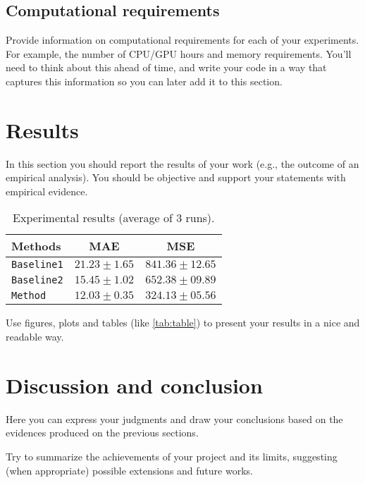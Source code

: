 \documentclass{gdl}
\begin{document}
\subsection{Computational requirements}
Provide information on computational requirements for each of your experiments. For example, the number of CPU/GPU hours and memory requirements. You'll need to think about this ahead of time, and write your code in a way that captures this information so you can later add it to this section. 

\section{Results}

In this section you should report the results of your work (e.g., the outcome of an empirical analysis). You should be objective and support your statements with empirical evidence.

\begin{table}[h]
\small\sf\centering
\caption{Experimental results (average of 3 runs).}
\begin{tabular}{l c c}
\toprule
Methods & MAE & MSE\\
\midrule
\texttt{Baseline1} & $21.23 \pm 1.65$ & $841.36 \pm 12.65$\\
\texttt{Baseline2} & $15.45 \pm 1.02$ & $652.38 \pm 09.89$\\
\midrule
\texttt{Method} & $12.03 \pm 0.35$ & $324.13 \pm 05.56$\\
\bottomrule
\end{tabular}
\label{tab:table}
\end{table}

Use figures, plots and tables (like \autoref{tab:table}) to present your results in a nice and readable way.

\section{Discussion and conclusion}

Here you can express your judgments and draw your conclusions based on the  evidences produced on the previous sections.

Try to summarize the achievements of your project and its limits, suggesting (when appropriate) possible extensions and future works.



\clearpage
\end{document}
